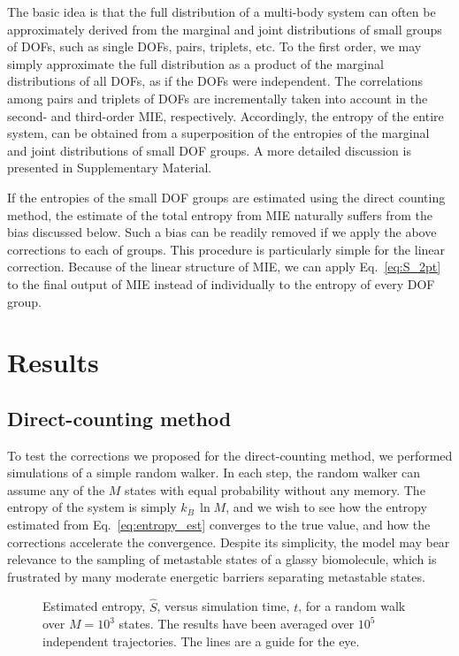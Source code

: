 \documentclass[reprint, superscriptaddress]{revtex4-1}
\begin{document}
The basic idea is that the full distribution of a multi-body system
can often be approximately derived
from the marginal and joint distributions of small groups of DOFs,
such as single DOFs, pairs, triplets, etc.
%
To the first order,
we may simply approximate the full distribution as a product
of the marginal distributions of all DOFs,
as if the DOFs were independent.
%
The correlations among pairs and triplets of DOFs
are incrementally taken into account in the second- and third-order MIE,
respectively.
%
Accordingly, the entropy of the entire system,
can be obtained from a superposition of the entropies
of the marginal and joint distributions
of small DOF groups.
%
A more detailed discussion is presented in
Supplementary Material.

If the entropies of the small DOF groups are estimated
using the direct counting method,
the estimate of the total entropy from MIE
naturally suffers from the bias discussed below.
%
Such a bias can be readily removed
if we apply the above corrections
to each of groups.
%
This procedure is particularly simple for the linear correction.
%
Because of the linear structure of MIE,
we can apply Eq.~\eqref{eq:S_2pt}
to the final output of MIE
instead of individually to the entropy of every DOF group.



\section{Results}

\subsection{Direct-counting method}

To test the corrections we proposed for the direct-counting method,
we performed simulations of a simple random walker.
%
In each step, the random walker can assume any of the $M$ states
with equal probability without any memory.
%
The entropy of the system is simply $k_B \, \ln M$,
and we wish to see how the entropy estimated
from Eq.~\eqref{eq:entropy_est} converges to the true value,
and how the corrections accelerate the convergence.
%
Despite its simplicity, the model may bear relevance
to the sampling of metastable states of a glassy biomolecule,
which is frustrated by many moderate energetic barriers
separating metastable states.

\begin{figure}[h]\centering
  \caption{
    \label{fig:walk_q1e3}
    Estimated entropy, $\hat S$,
    versus simulation time, $t$, for a random walk over $M = 10^3$ states.
    The results have been averaged over $10^5$ independent trajectories.
    The lines are a guide for the eye.
  }
\end{figure}
\end{document}
